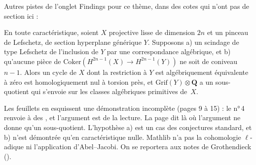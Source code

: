 \bigskip
\noindent Autres pistes de l'onglet Findings pour ce thème, dans des cotes qui n'ont pas de section ici :\par

\begin{encadre}
\begin{theoreme*}\nonverifie
En toute caractéristique, soient $X$ projective lisse de dimension $2n$ et un pinceau de Lefschetz, de section hyperplane générique $Y$. Supposons a) un scindage de type Lefschetz de l'inclusion de $Y$ par une correspondance algébrique, et b) qu'aucune pièce de $\mathrm{Coker}(H^{2n-1}(X) \to H^{2n-1}(Y))$ ne soit de coniveau $n-1$. Alors un cycle de $X$ dont la restriction à $Y$ est algébriquement équivalente à zéro est homologiquement nul à torsion près, et $\mathrm{Grif}(Y) \otimes \mathbf Q$ a un sous-quotient qui s'envoie sur les classes algébriques primitives de~$X$.
\end{theoreme*}
\end{encadre}
{\small Les feuillets en esquissent une démonstration incomplète (pages 9 à 15) : le n°\,4 renvoie à des , et l'argument est de la lecture. La page dit  là où l'argument ne donne qu'un sous-quotient. L'hypothèse a) est un cas des conjectures standard, et b) n'est démontrée qu'en caractéristique nulle. Mathlib n'a pas la cohomologie $\ell$-adique ni l'application d'Abel--Jacobi. On se reportera aux notes de Grothendieck ().\par}

